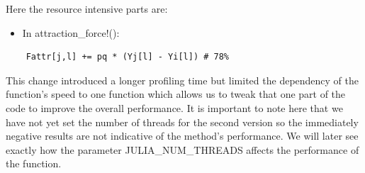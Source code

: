 Here the resource intensive parts are:
\begin{itemize}
    \item In attraction\_force!(): 
\end{itemize}
\begin{verbatim}
    Fattr[j,l] += pq * (Yj[l] - Yi[l]) # 78%
\end{verbatim}

This change introduced a longer profiling time but limited the dependency of the function's speed
to one function which allows us to tweak that one part of the code to improve the overall performance.
It is important to note here that we have not yet set the number of threads for the second version
so the immediately negative results are not indicative of the method's performance. We will later
see exactly how the parameter JULIA\_NUM\_THREADS affects the performance of the function.

